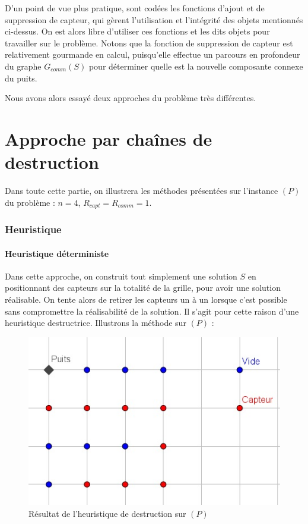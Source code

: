 \documentclass[12pt,a4paper]{article}
\begin{document}
D'un point de vue plus pratique, sont codées les fonctions d'ajout et de suppression de capteur, qui gèrent l'utilisation et l'intégrité des objets mentionnés ci-dessus. On est alors libre d'utiliser ces fonctions et les dits objets pour travailler sur le problème. Notons que la fonction de suppression de capteur est relativement gourmande en calcul, puisqu'elle effectue un parcours en profondeur du graphe $G_{comm}(S)$ pour déterminer quelle est la nouvelle composante connexe du puits.



Nous avons alors essayé deux approches du problème très différentes.

\part{Approche par chaînes de destruction}
Dans toute cette partie, on illustrera les méthodes présentées sur l'instance $(P)$ du problème : $n=4$, $R_{capt}=R_{comm}=1$.
\section{Heuristique}
\subsection {Heuristique déterministe}
Dans cette approche, on construit tout simplement une solution $S$ en positionnant des capteurs sur la totalité de la grille, pour avoir une solution réalisable. On tente alors de retirer les capteurs un à un lorsque c'est possible sans compromettre la réalisabilité de la solution. Il s'agit pour cette raison d'une heuristique destructrice.
Illustrons la méthode sur $(P)$ : 
\begin{figure}[h]
\center
\includegraphics[scale=1]{Images/4_1_1_naif.jpg}
\caption{Résultat de l'heuristique de destruction sur $(P)$}
\end{figure}
\end{document}
